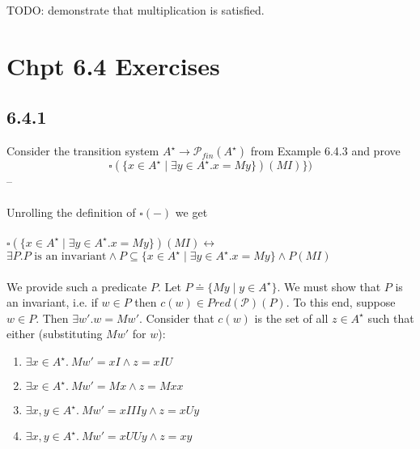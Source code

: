 \documentclass{article}
\begin{document}
\begin{center}
\end{center}

TODO: demonstrate that multiplication is satisfied.

\section*{Chpt 6.4 Exercises}

\subsection*{6.4.1}

Consider the transition system $A^\star \to \mathcal P_{fin}(A^{\star})$ from Example 6.4.3 and prove
$$\square(\{ x \in A^{\star} \mid \exists y \in A^{\star}. x = My \} ) (MI) \})$$
--\\~\\
Unrolling the definition of $\square(-)$ we get\\~\\
$\square(\{ x \in A^{\star} \mid \exists y \in A^{\star}. x = My \})(MI) \leftrightarrow$\\
$\exists P. P\text{ is an invariant} \wedge P \subseteq \{ x \in A^\star \mid \exists y \in A^\star. x = My \} \wedge P(MI)$\\~\\
We provide such a predicate $P$. Let $P \doteq \{ My \mid y \in A^\star \}$. We must show that $P$ is an invariant, i.e. if $w \in P$ then $c(w) \in \mathit{Pred}(\mathcal P)(P)$. To this end, suppose $w \in P$. Then $\exists w'. w = Mw'$.
Consider that $c(w)$ is the set of all $z \in A^\star$ such that either (substituting $Mw'$ for $w$):
\begin{enumerate}
\item $\exists x \in A^\star.~Mw'=xI \wedge z = xIU$
\item $\exists x \in A^\star.~Mw' = Mx \wedge z = Mxx$
\item $\exists x,y \in A^\star.~Mw'=xIIIy \wedge z = xUy$
\item $\exists x,y \in A^\star.~Mw'=xUUy \wedge z =xy$
\end{enumerate}
\end{document}
